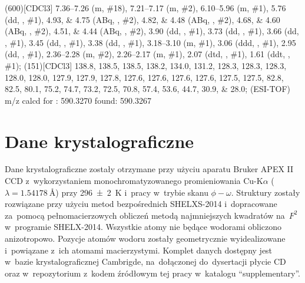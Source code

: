 \begin{fullexp}
	\NMR(600)[CDCl3] \numrange{7.36}{7.26} (m, \#{18}), \numrange{7.21}{7.17} (m, \#{2}), \numrange{6.10}{5.96} (m, \#{1}), \num{5.76} (dd, , \#{1}), \numlist{4.93;4.75} (ABq, , \#{2}), \numlist{4.82;4.48} (ABq, , \#{2}), \numlist{4.68;4.60} (ABq, , \#{2}), \numlist{4.51;4.44} (ABq, , \#{2}), \num{3.90} (dd, , \#{1}), \num{3.73} (dd, , \#{1}), \num{3.66} (dd, , \#{1}), \num{3.45} (dd, , \#{1}), \num{3.38} (dd, , \#{1}), \numrange{3.18}{3.10} (m, \#{1}), \num{3.06} (ddd, , \#{1}), \num{2.95} (dd, , \#{1}), \numrange{2.36}{2.28} (m, \#{2}), \numrange{2.26}{2.17} (m, \#{1}), \num{2.07} (dtd, , \#{1}), \num{1.61} (ddt, , \#{1}); 
	(151)[CDCl3] \numlist{138.8; 138.5; 138.5; 138.2; 134.0; 131.2; 128.3; 128.3; 128.3; 128.0; 128.0; 127.9; 127.9; 127.8; 127.6; 127.6; 127.6; 127.6; 127.5; 127.5; 82.8; 82.5; 80.1; 75.2; 74.7; 73.2; 72.5; 70.8; 57.4; 53.6; 44.7; 30.9; 28.0}; 
	 (ESI-TOF) m/z calcd for : \num{590.3270} found: \num{590.3267}
\end{fullexp}


\section{Dane krystalograficzne}\label{experimental:xray}
Dane krystalograficzne zostały otrzymane przy użyciu aparatu Bruker APEX II CCD
  z~wykorzystaniem monochromatyzowanego promieniowania Cu-K$\alpha$
  ($\lambda=\SI{1.54178}{\angstrom}$) przy \SI{296(2)}{\kelvin} i~pracy w~trybie skanu $\phi-\omega$.
Struktury zostały rozwiązane przy użyciu metod bezpośrednich SHELXS-2014 
  i~dopracowane za~pomocą pełnomacierzowych obliczeń metodą najmniejszych kwadratów na~$F^2$
  w~programie SHELX-2014.
Wszystkie atomy nie będące wodorami obliczono anizotropowo.
Pozycje atomów wodoru zostały geometrycznie wyidealizowane i~powiązane z~ich atomami macierzystymi.
Komplet danych dostępny jest w~bazie krystalograficznej Cambrigde, na~dołączonej do~dysertacji płycie CD oraz w~repozytorium\sidenote{\repourl}
  z~kodem źródłowym tej pracy w~katalogu \enquote{supplementary}.

